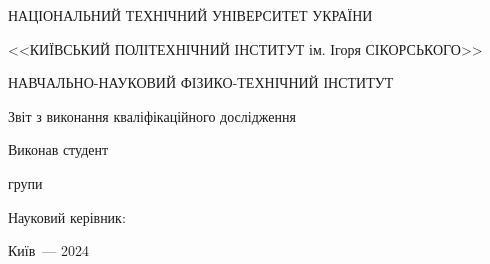 \thispagestyle{empty}

\begin{center}
НАЦІОНАЛЬНИЙ ТЕХНІЧНИЙ УНІВЕРСИТЕТ УКРАЇНИ \par
<<КИЇВСЬКИЙ ПОЛІТЕХНІЧНИЙ ІНСТИТУТ ім. Ігоря СІКОРСЬКОГО>>\par
НАВЧАЛЬНО-НАУКОВИЙ ФІЗИКО-ТЕХНІЧНИЙ ІНСТИТУТ\par

\vspace{40mm}
{\huge Звіт з виконання кваліфікаційного дослідження \par}

\huge\MakeUppercase{\textbf{\reportTitle}} \par
\end{center}

\vspace{40mm}
\begin{flushright}
Виконав студент

групи \reportAuthorGroup

\reportAuthor

\vspace{20mm}
Науковий керівник:

\supervisorRegalia

\supervisorFio

\end{flushright}

\vspace{20mm}
\begin{center}
{Київ~--- 2024}
\end{center}

\newpage
\thispagestyle{plain}
